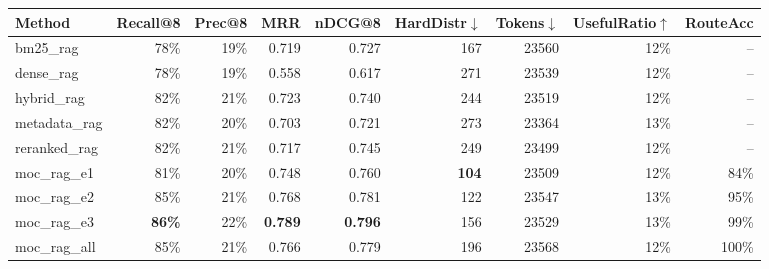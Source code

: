 \begin{tabular}{l rrrr rr rr}
\toprule
Method & Recall@8 & Prec@8 & MRR & nDCG@8 & HardDistr$\downarrow$ & Tokens$\downarrow$ & UsefulRatio$\uparrow$ & RouteAcc \\
\midrule
bm25\_rag & 78\% & 19\% & 0.719 & 0.727 & 167 & 23560 & 12\% & -- \\
dense\_rag & 78\% & 19\% & 0.558 & 0.617 & 271 & 23539 & 12\% & -- \\
hybrid\_rag & 82\% & 21\% & 0.723 & 0.740 & 244 & 23519 & 12\% & -- \\
metadata\_rag & 82\% & 20\% & 0.703 & 0.721 & 273 & 23364 & 13\% & -- \\
reranked\_rag & 82\% & 21\% & 0.717 & 0.745 & 249 & 23499 & 12\% & -- \\
\rowcolor{mocblue!8} moc\_rag\_e1 & 81\% & 20\% & 0.748 & 0.760 & \textbf{104} & 23509 & 12\% & 84\% \\
\rowcolor{mocblue!8} moc\_rag\_e2 & 85\% & 21\% & 0.768 & 0.781 & 122 & 23547 & 13\% & 95\% \\
\rowcolor{mocblue!8} moc\_rag\_e3 & \textbf{86\%} & 22\% & \textbf{0.789} & \textbf{0.796} & 156 & 23529 & 13\% & 99\% \\
\rowcolor{mocblue!8} moc\_rag\_all & 85\% & 21\% & 0.766 & 0.779 & 196 & 23568 & 12\% & 100\% \\
\bottomrule
\end{tabular}
